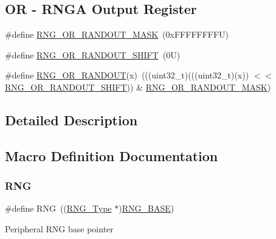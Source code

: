 \subsection*{OR -\/ R\+N\+GA Output Register}
\begin{DoxyCompactItemize}
\item 
\#define \mbox{\hyperlink{group___r_n_g___register___masks_gaa29938490b0cc9d23a54a137c62ba64a}{R\+N\+G\+\_\+\+O\+R\+\_\+\+R\+A\+N\+D\+O\+U\+T\+\_\+\+M\+A\+SK}}~(0x\+F\+F\+F\+F\+F\+F\+F\+F\+U)
\item 
\#define \mbox{\hyperlink{group___r_n_g___register___masks_ga3f7e8e180fafb10fbbe34e9dced30b87}{R\+N\+G\+\_\+\+O\+R\+\_\+\+R\+A\+N\+D\+O\+U\+T\+\_\+\+S\+H\+I\+FT}}~(0\+U)
\item 
\#define \mbox{\hyperlink{group___r_n_g___register___masks_gadee84e83028dd2a869b62f046e20f795}{R\+N\+G\+\_\+\+O\+R\+\_\+\+R\+A\+N\+D\+O\+UT}}(x)~(((uint32\+\_\+t)(((uint32\+\_\+t)(x)) $<$$<$ \mbox{\hyperlink{group___r_n_g___register___masks_ga3f7e8e180fafb10fbbe34e9dced30b87}{R\+N\+G\+\_\+\+O\+R\+\_\+\+R\+A\+N\+D\+O\+U\+T\+\_\+\+S\+H\+I\+FT}})) \& \mbox{\hyperlink{group___r_n_g___register___masks_gaa29938490b0cc9d23a54a137c62ba64a}{R\+N\+G\+\_\+\+O\+R\+\_\+\+R\+A\+N\+D\+O\+U\+T\+\_\+\+M\+A\+SK}})
\end{DoxyCompactItemize}


\subsection{Detailed Description}


\subsection{Macro Definition Documentation}
\mbox{\label{group___r_n_g___register___masks_ga5b0885b8b55bbc13691092b704d9309f}} 
\subsubsection{\texorpdfstring{R\+NG}{RNG}}
{\footnotesize\ttfamily \#define R\+NG~((\mbox{\hyperlink{struct_r_n_g___type}{R\+N\+G\+\_\+\+Type}} $\ast$)\mbox{\hyperlink{group___r_n_g___register___masks_gab92662976cfe62457141e5b4f83d541c}{R\+N\+G\+\_\+\+B\+A\+SE}})}

Peripheral R\+NG base pointer \mbox{\label{group___r_n_g___register___masks_gab92662976cfe62457141e5b4f83d541c}} 
